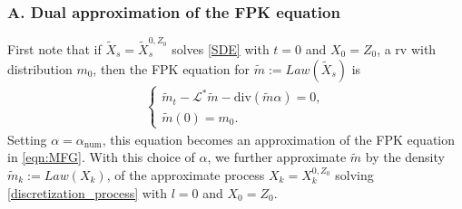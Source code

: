 \documentclass[a4paper,  twoside, 10pt, leqno]{amsart}
\newcommand{\rd}{\mathbb{R}^d}
\theoremstyle{remark}
\theoremstyle{definition}
\begin{document}


\subsubsection*{A. Dual approximation of the FPK equation} 

First note that if $\tilde X_s=\tilde X^{0,Z_0}_s$ solves \eqref{SDE} with $t=0$ and $X_0  = Z_0$, a rv with distribution $m_0$, then the FPK equation for $\tilde m:=Law(\tilde X_s)$ is
\begin{align*}
\begin{cases}
        \tilde m_t - \mathcal{L}^*\tilde m - \text{div} ( \tilde m \alpha) = 0, \\
        \tilde m ( 0 ) = m_{0}.
\end{cases}
\end{align*}
Setting $\alpha = \alpha_{\text{num}}$, this equation becomes an approximation of the FPK equation in \eqref{eqn:MFG}. With this choice of $\alpha$, we further approximate $\tilde m$ by the density $\tilde m_k:= Law(X_k)$, of the approximate process $X_k=X_k^{0,Z_0}$ solving \eqref{discretization_process} with $l=0$ and $X_0=Z_0$. 
\end{document}
